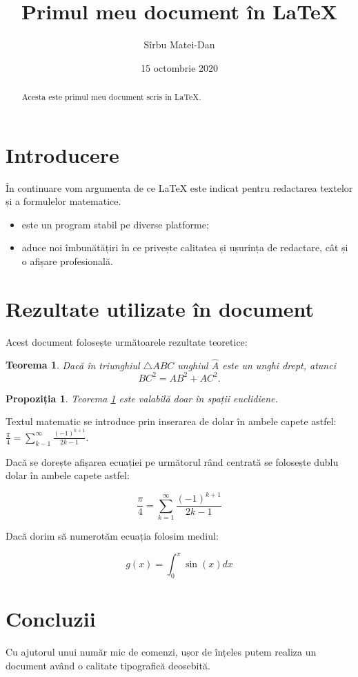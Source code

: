 \documentclass[9pt,a4paper]{article}
\title{\bf Primul meu document în \LaTeX{}}
\author{Sîrbu Matei-Dan}
\date{15 octombrie 2020}
\newtheorem{teorema}{Teorema}
\newtheorem{prop}{Propoziția}
\begin{document}
\maketitle

\begin{abstract}
    Acesta este primul meu document scris în \LaTeX{}.
\end{abstract}

\section{Introducere}
    În continuare vom argumenta de ce \LaTeX{} este indicat pentru redactarea textelor și a formulelor matematice.

\begin{itemize}
    \item este un program stabil pe diverse platforme;
    \item aduce noi îmbunătățiri în ce privește calitatea și ușurința de redactare, cât și o afișare profesională.
\end{itemize}

\section{Rezultate utilizate în document}

Acest document folosește următoarele rezultate teoretice:
\begin{teorema}\label{pitagora}
    Dacă în triunghiul $\triangle ABC$ unghiul $\hat A$ este un unghi drept, atunci $$BC^2=AB^2+AC^2.$$
\end{teorema}

\begin{prop}
    Teorema \ref{pitagora} este valabilă doar în spații euclidiene.
\end{prop}

Textul matematic se introduce prin inserarea de dolar în ambele capete astfel:
$\frac{\pi}{4}=\sum_{k-1}^{\infty}\frac{(-1)^{k+1}}{2k-1}$.

Dacă se dorește afișarea ecuației pe următorul rând centrată se folosește dublu dolar în ambele capete astfel:

$$\frac{\pi}{4}=\sum_{k=1}^{\infty}\frac{(-1)^{k+1}}{2k-1}$$

Dacă dorim să numerotăm ecuația folosim mediul:

\begin{equation}\label{eq1}
    g(x)=\int_{0}^{\pi}\sin(x)dx
\end{equation}

\section{Concluzii}

Cu ajutorul unui număr mic de comenzi, ușor de înțeles putem realiza un document având o calitate tipografică deosebită.
\end{document}
